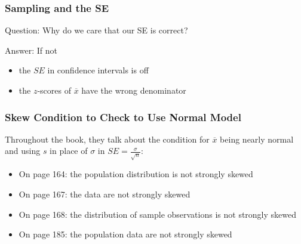\documentclass[handout]{beamer}
\newcommand{\blue}[1]{\textcolor{blue2}{#1}}
\newcommand{\xbar}{\overline{x}}
\begin{document}
\begin{frame}[fragile]
\frametitle{Sampling and the SE}
\blue{Question}:  Why do we care that our SE is correct?

\pause\vspace{0.5cm}

\blue{Answer}:  If not
\begin{itemize}
\item the $SE$ in confidence intervals is off
\item the $z$-scores of $\xbar$ have the wrong denominator
\end{itemize}

\end{frame}


%
%


\begin{frame}
\frametitle{Skew Condition to Check to Use Normal Model}
Throughout the book, they talk about the condition for $\xbar$ being nearly normal and using $s$ in place of $\sigma$ in $SE=\frac{\sigma}{\sqrt{n}}$:

\vspace{0.25cm}

\begin{itemize}
\pause\item On page 164: the population distribution is not strongly skewed
\pause\item On page 167: the data are not strongly skewed
\pause\item On page 168: the distribution of sample observations is not strongly skewed
\pause\item On page 185: the population data are not strongly skewed
\end{itemize}

\end{frame}
\end{document}
